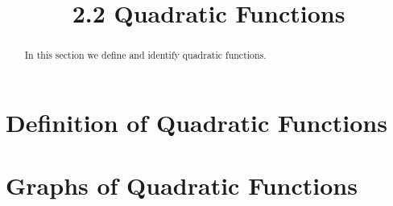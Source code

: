 \documentclass[handout]{ximera}
\title{2.2 Quadratic Functions}
\begin{document}
\begin{abstract}
In this section we define and identify quadratic functions.
\end{abstract}

\maketitle


\section{Definition of Quadratic Functions}




\section{Graphs of Quadratic Functions}
\end{document}
